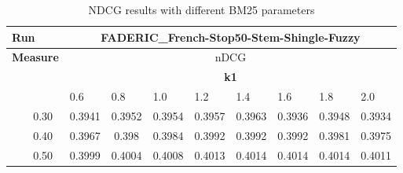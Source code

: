 \begin{table}[tbp]
\caption{\label{tab:BM25} NDCG results with different BM25 parameters}
\begin{tabular}{|cc|cccccccc|}
\toprule
\multicolumn{2}{|l|}{\textbf{Run}} & \multicolumn{8}{c|}{FADERIC\_French-Stop50-Stem-Shingle-Fuzzy}\\
\midrule
\multicolumn{2}{|l|}{\textbf{Measure}} & \multicolumn{8}{c|}{nDCG}\\
\midrule
& \multicolumn{1}{l|}{}    & \multicolumn{8}{c|}{\textbf{k1}}\\
\cmidrule{3-10}
 & \multicolumn{1}{l|}{}  & \multicolumn{1}{l|}{0.6} & \multicolumn{1}{l|}{0.8} & \multicolumn{1}{l|}{1.0} & \multicolumn{1}{l|}{1.2} & \multicolumn{1}{l|}{1.4} & \multicolumn{1}{l|}{1.6} & \multicolumn{1}{l|}{1.8}   & \multicolumn{1}{l|}{2.0} \\
\midrule
\multicolumn{1}{|c|}{}                             & 0.30                      & \multicolumn{1}{c|}{\cellcolor[HTML]{E27066}0.3941} & \multicolumn{1}{c|}{\cellcolor[HTML]{E67F66}0.3952} & \multicolumn{1}{r|}{\cellcolor[HTML]{E78266}0.3954} & \multicolumn{1}{c|}{\cellcolor[HTML]{E88766}0.3957} & \multicolumn{1}{c|}{\cellcolor[HTML]{EB8F66}0.3963} & \multicolumn{1}{c|}{\cellcolor[HTML]{E06866}0.3936}          & \multicolumn{1}{c|}{\cellcolor[HTML]{E57A66}0.3948}          & \cellcolor[HTML]{E06666}0.3934 \\ %
\multicolumn{1}{|c|}{}                             & 0.40                      & \multicolumn{1}{c|}{\cellcolor[HTML]{EC9566}0.3967} & \multicolumn{1}{c|}{\cellcolor[HTML]{F1A866}0.398}  & \multicolumn{1}{c|}{\cellcolor[HTML]{F3AD66}0.3984} & \multicolumn{1}{c|}{\cellcolor[HTML]{F6B966}0.3992} & \multicolumn{1}{c|}{\cellcolor[HTML]{F6B966}0.3992} & \multicolumn{1}{c|}{\cellcolor[HTML]{F6B966}0.3992}          & \multicolumn{1}{c|}{\cellcolor[HTML]{F2A966}0.3981}          & \cellcolor[HTML]{EFA066}0.3975 \\ %
\multicolumn{1}{|c|}{}                             & 0.50                      & \multicolumn{1}{c|}{\cellcolor[HTML]{F9C366}0.3999} & \multicolumn{1}{c|}{\cellcolor[HTML]{FBCA66}0.4004} & \multicolumn{1}{c|}{\cellcolor[HTML]{FCD066}0.4008} & \multicolumn{1}{c|}{\cellcolor[HTML]{FED766}0.4013} & \multicolumn{1}{c|}{\cellcolor[HTML]{FFD966}0.4014} & \multicolumn{1}{c|}{\cellcolor[HTML]{FFD966}0.4014}          & \multicolumn{1}{c|}{\cellcolor[HTML]{FFD966}0.4014}          & \cellcolor[HTML]{FDD466}0.4011 \\ %

\end{tabular}
\end{table}
